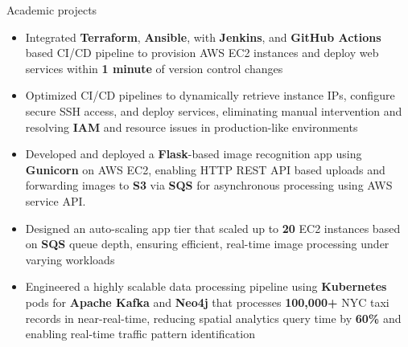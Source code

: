 \documentclass{resume}
\begin{document}
\begin{experienceSection}{Academic projects}

    \projectItem[
        title={End-to-end Deployment Automation},
        duration={Apr 2025},
    ]
    \begin{itemize}
        \vspace{-0.5em}
        \itemsep -6pt {}

        \item Integrated \textbf{Terraform}, \textbf{Ansible}, with \textbf{Jenkins}, and \textbf{GitHub Actions} based CI/CD pipeline to provision AWS EC2 instances and deploy web services within \textbf{1 minute} of version control changes
        \item Optimized CI/CD pipelines to dynamically retrieve instance IPs, configure secure SSH access, and deploy services,
        eliminating manual intervention and resolving \textbf{IAM} and resource issues in production-like environments
    \end{itemize}

    \projectItem[
        title=AWS-based Face Recognition App,
        duration={May 2024},
    ]
    \begin{itemize}
        \vspace{-0.5em}
        \itemsep -6pt {}
        \item Developed and deployed a \textbf{Flask}-based image recognition app using \textbf{Gunicorn} on AWS EC2, enabling HTTP REST API based uploads and forwarding images to \textbf{S3} via \textbf{SQS} for asynchronous processing using AWS service API.
        \item Designed an auto-scaling app tier that scaled up to \textbf{20} EC2 instances based on \textbf{SQS} queue depth, ensuring efficient, real-time image processing under varying workloads
    \end{itemize}

    \projectItem[
        title=Kubernetes-based Data Processing Pipeline,
        duration={Nov 2024},
    ]
    \begin{itemize}
        \vspace{-0.5em}
        \itemsep -6pt {}
        \item Engineered a highly scalable data processing pipeline using \textbf{Kubernetes} pods for \textbf{Apache Kafka} and \textbf{Neo4j} that processes \textbf{100,000+} NYC taxi records in near-real-time, reducing spatial analytics query time by \textbf{60\%} and enabling real-time traffic pattern identification
    \end{itemize}
    
\end{experienceSection}
\end{document}
